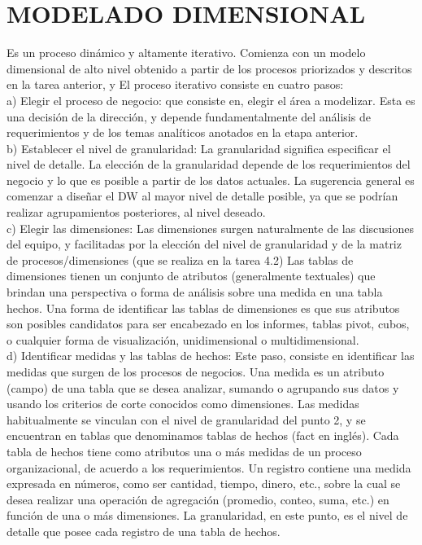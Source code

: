 \section{MODELADO DIMENSIONAL}
Es un proceso dinámico y altamente iterativo. Comienza con un modelo dimensional de alto nivel obtenido a partir de los procesos priorizados y descritos en la tarea anterior, y El proceso iterativo consiste en cuatro pasos:\\
a)	Elegir el proceso de negocio: que consiste en, elegir el área a modelizar. Esta es una decisión de la dirección, y depende fundamentalmente del análisis de requerimientos y de los temas analíticos anotados en la etapa anterior.\\
b)	Establecer el nivel de granularidad: La granularidad significa especificar el nivel de detalle. La elección de la granularidad depende de los requerimientos del negocio y lo que es posible a partir de los datos actuales. La sugerencia general es comenzar a diseñar el DW al mayor nivel de detalle posible, ya que se podrían realizar agrupamientos posteriores, al nivel deseado.\\
c)	Elegir las dimensiones: Las dimensiones surgen naturalmente de las discusiones del equipo, y facilitadas por la elección del nivel de granularidad y de la matriz de procesos/dimensiones (que se realiza en la tarea 4.2) Las tablas de dimensiones tienen un conjunto de atributos (generalmente textuales) que brindan una perspectiva o forma de análisis sobre una medida en una tabla hechos. Una forma de identificar las tablas de dimensiones es que sus atributos son posibles candidatos para ser encabezado en los informes, tablas pivot, cubos, o cualquier forma de visualización, unidimensional o multidimensional.\\
d)	Identificar medidas y las tablas de hechos: Este paso, consiste en identificar las medidas que surgen de los procesos de negocios. Una medida es un atributo (campo) de una tabla que se desea analizar, sumando o agrupando sus datos y usando los criterios de corte conocidos como dimensiones. Las medidas habitualmente se vinculan con el nivel de granularidad del punto 2, y se encuentran en tablas que denominamos tablas de hechos (fact en inglés). Cada tabla de hechos tiene como atributos una o más medidas de un proceso organizacional, de acuerdo a los requerimientos. Un registro contiene una medida expresada en números, como ser cantidad, tiempo, dinero, etc., sobre la cual se desea realizar una operación de agregación (promedio, conteo, suma, etc.) en función de una o más dimensiones. La granularidad, en este punto, es el nivel de detalle que posee cada registro de una tabla de hechos.\\
